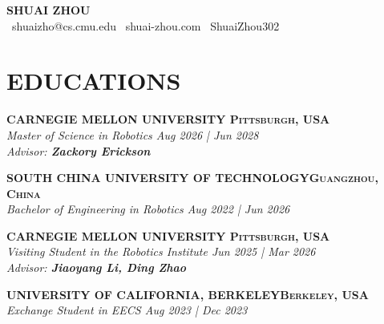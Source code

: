 \documentclass[a4paper,9pt]{extarticle}
\begin{document}
\pagestyle{fancy}
\renewcommand{\headrulewidth}{0pt}
\fancyhead{}
\thispagestyle{empty} %

\vspace*{-0.55in}
\begin{center}
{\fontsize{20pt}{36pt}\selectfont\textbf{SHUAI ZHOU}}\\[2pt] %
\faEnvelope\ shuaizho@cs.cmu.edu
\quad \textbar{} \quad
\faHome\ shuai-zhou.com
\quad \textbar{} \quad
\faGithub\ ShuaiZhou302
\end{center}
\vspace{-0.20in}

\section*{{\textbf{\fontsize{14pt}{8pt}\selectfont E}\textbf{\scshape DUCATIONS}}}
\vspace{-0.10in}
{\textbf{\fontsize{12pt}{4pt}\selectfont C}\textbf{\scshape ARNEGIE MELLON UNIVERSITY \hfill Pittsburgh, USA}}\\ %
\textit{Master of Science in Robotics  \hfill Aug 2026 | Jun 2028} \\
\textit{Advisor: \textbf{Zackory Erickson}}
\par\vspace{4pt}\noindent
{\textbf{\fontsize{12pt}{4pt}\selectfont S}\textbf{\scshape OUTH CHINA UNIVERSITY OF TECHNOLOGY\hfill Guangzhou, China}}\\ %
\textit{Bachelor of Engineering in Robotics  \hfill Aug 2022 | Jun 2026} 
\par\vspace{4pt}\noindent
{\textbf{\fontsize{12pt}{4pt}\selectfont C}\textbf{\scshape ARNEGIE MELLON UNIVERSITY \hfill Pittsburgh, USA}}\\ %
\textit{Visiting Student in the Robotics Institute  \hfill Jun 2025 | Mar 2026} \\
\textit{Advisor: \textbf{Jiaoyang Li, Ding Zhao}}
\par\vspace{4pt}\noindent
{\textbf{\fontsize{12pt}{4pt}\selectfont U}\textbf{\scshape NIVERSITY OF CALIFORNIA, BERKELEY\hfill Berkeley, USA}}\\ %
\textit{Exchange Student in EECS \hfill   Aug 2023 | Dec 2023} %
\end{document}
